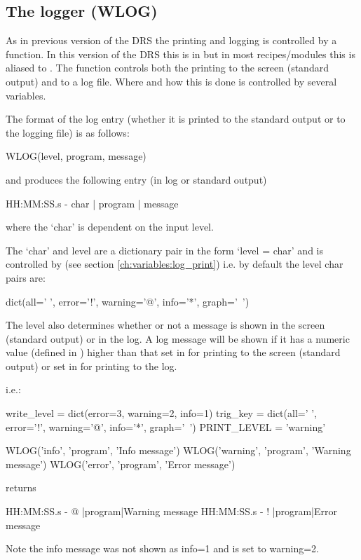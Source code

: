 \clearpage
\newpage
\subsection{The logger (WLOG)}
\label{ch:rules:drs_specific:logger}

As in previous version of the DRS the printing and logging is controlled by a function. In this version of the DRS this is in  but in most recipes/modules this is aliased to . The  function controls both the printing to the screen (standard output) and to a log file. Where and how this is done is controlled by several variables.

The format of the log entry (whether it is printed to the standard output or to the logging file) is as follows:
\begin{pythonbox}
WLOG(level, program, message)
\end{pythonbox}
\noindent and produces the following entry (in log or standard output)
\begin{cmdboxprint}
HH:MM:SS.s - char | program | message
\end{cmdboxprint}
\noindent where the `char' is dependent on the input level. 

\noindent The `char' and level are a dictionary pair in the form `level = char' and is controlled by  (see section \ref{ch:variables:log_print}) i.e. by default the level char pairs are:
\begin{pythonbox}
dict(all=' ', error='!', warning='@', info='*', graph='~')
\end{pythonbox}

\noindent The level also determines whether or not a message is shown in the screen (standard output) or in the log. A log message will be shown if it has a numeric value (defined in ) higher than that set in  for printing to the screen (standard output) or set in  for printing to the log.

i.e.: 
\begin{pythonbox}
write_level = dict(error=3, warning=2, info=1)
trig_key = dict(all=' ', error='!', warning='@', info='*', graph='~')
PRINT_LEVEL = 'warning'

WLOG('info', 'program', 'Info message')
WLOG('warning', 'program', 'Warning message')
WLOG('error', 'program', 'Error message')
\end{pythonbox}
returns
\begin{cmdboxprint}
HH:MM:SS.s - @ |program|Warning message
HH:MM:SS.s - ! |program|Error message
\end{cmdboxprint}
\begin{note}
Note the info message was not shown as info=1 and  is set to warning=2.
\end{note}

